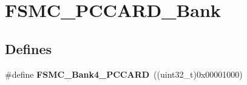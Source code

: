 \hypertarget{group__FSMC__PCCARD__Bank}{
\section{FSMC\_\-PCCARD\_\-Bank}
\label{group__FSMC__PCCARD__Bank}
}
\subsection*{Defines}
\begin{DoxyCompactItemize}
\item 
\hypertarget{group__FSMC__PCCARD__Bank_gad08ce7c7afc462f3d9ef085b05d42387}{
\#define {\bfseries FSMC\_\-Bank4\_\-PCCARD}~((uint32\_\-t)0x00001000)}
\label{group__FSMC__PCCARD__Bank_gad08ce7c7afc462f3d9ef085b05d42387}

\end{DoxyCompactItemize}

